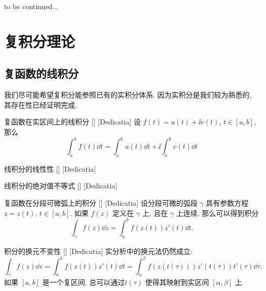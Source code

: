 \documentclass[UTF8]{ctexart}
\newcommand{\continued}{{\Large to be continued...}}
\begin{document}
        \continued

\section{复积分理论}

    \subsection{复函数的线积分}
    
        我们尽可能希望复积分能参照已有的实积分体系. 因为实积分是我们较为熟悉的, 其存在性已经证明完成. 
        
        \begin{dfn}
            [UUID]
            {复函数在实区间上的线积分}
            []
            [Dedicatia]
            设 \(f(t)=u(t)+\ii v(t)\),  \(t\in[a,b]\), 那么
            \[\int_{a}^{b}f(t)\dd{t}=\int_{a}^{b}u(t)\dd{t}+\ii\int_{a}^{b}v(t)\dd{t}\]
        \end{dfn}
        
        \begin{ppt}
            [UUID]
            {线积分的线性性}
            []
            [Dedicatia]
        \end{ppt}

        \begin{ppt}
            [UUID]
            {线积分的绝对值不等式}
            []
            [Dedicatia]
        \end{ppt}

        \begin{crl}
            [UUID]
            {复函数在分段可微弧上的积分}
            []
            [Dedicatia]
            设分段可微的弧段 \(\gamma\) 具有参数方程 \(z=z(t)\),  \(t\in[a,b]\). 如果 \(f(z)\) 定义在 \(\gamma\) 上, 且在 \(\gamma\) 上连续, 那么可以得到积分
            \[\int_\gamma f(z)\dd{z}=\int_{a}^{b}f(z(t))z'(t)\dd{t}.\]
        \end{crl}

        \begin{ppt}
            [UUID]
            {积分的换元不变性}
            []
            [Dedicatia]
            实分析中的换元法仍然成立: 
            \[\int_\gamma f(z)\dd{z}=\int_{a}^{b}f(z(t))z'(t)\dd{t}=\int_{\alpha}^{\beta}f(z(t(\tau)))z'(t(\tau))t'(\tau)\dd{\tau}.\]
            如果 \([a,b]\) 是一个复区间, 总可以通过\ConformalMapping  \(t(\tau)\) 使得其映射到实区间 \([\alpha,\beta]\) 上. 
        \end{ppt}
\end{document}

